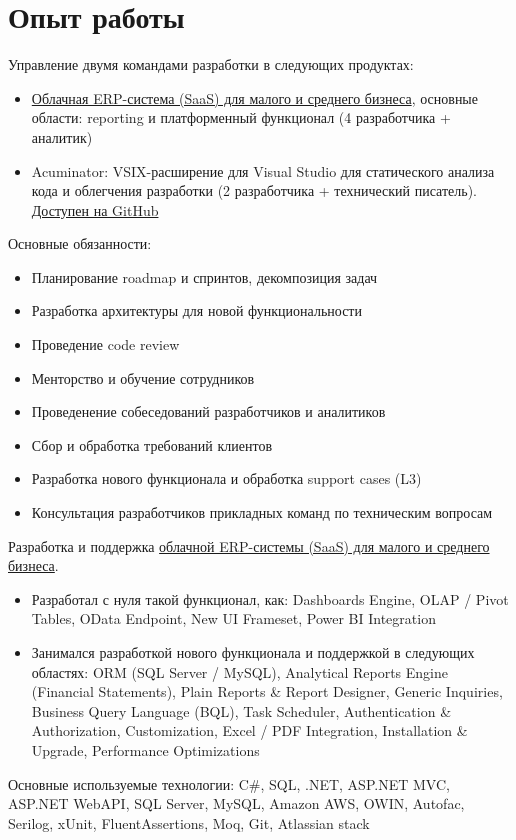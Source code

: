 \section{Опыт работы}
{Управление двумя командами разработки в следующих продуктах:
\begin{itemize}
  \item \href{https://www.acumatica.com/}{Облачная ERP-система (SaaS) для малого и среднего бизнеса}, основные области: reporting и платформенный функционал (4 разработчика + аналитик)
  \item Acuminator: VSIX-расширение для Visual Studio для статического анализа кода и облегчения разработки (2 разработчика + технический писатель). \href{https://github.com/Acumatica/Acuminator}{Доступен на GitHub \faGithub}
\end{itemize}
Основные обязанности:
\begin{itemize}[label=\textbullet]
  \item Планирование roadmap и спринтов, декомпозиция задач
  \item Разработка архитектуры для новой функциональности
  \item Проведение code review
  \item Менторство и обучение сотрудников
  \item Проведенение собеседований разработчиков и аналитиков
  \item Сбор и обработка требований клиентов
  \item Разработка нового функционала и обработка support cases (L3)
  \item Консультация разработчиков прикладных команд по техническим вопросам
\end{itemize}}
{Разработка и поддержка \href{https://www.acumatica.com/}{облачной ERP-системы (SaaS) для малого и среднего бизнеса}.
\begin{itemize}[label=\textbullet]
  \item Разработал с нуля такой функционал, как: Dashboards Engine, OLAP / Pivot Tables, OData Endpoint, New UI Frameset, Power BI Integration
  \item Занимался разработкой нового функционала и поддержкой в следующих областях: ORM (SQL Server / MySQL), Analytical Reports Engine (Financial Statements), Plain Reports \& Report Designer, Generic Inquiries, Business Query Language (BQL), Task Scheduler, Authentication \& Authorization, Customization, Excel / PDF Integration, Installation \& Upgrade, Performance Optimizations
\end{itemize}
Основные используемые технологии: C\#, SQL, .NET, ASP.NET MVC, ASP.NET WebAPI, SQL Server, MySQL, Amazon AWS, OWIN, Autofac, Serilog, xUnit, FluentAssertions, Moq, Git, Atlassian stack}
